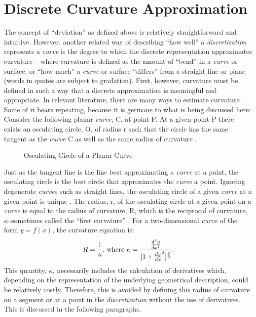 \section{Discrete Curvature Approximation}
The concept of ``deviation'' as defined above is relatively 
straightforward and intuitive. However, another related way of describing 
``how well'' a \textit{discretization} represents a \textit{curve} is the 
degree to which the discrete representation approximates curvature -- 
where curvature is defined as the amount of ``bend'' in a \textit{curve} 
or surface, or ``how much'' a \textit{curve} or surface ``differs'' from a 
straight line or plane (words in quotes are subject to gradation). First, 
however, curvature must be defined in such a way that a discrete 
approximation is meaningful and appropriate. In relevant literature, there 
are many ways to estimate curvature \cite{hermann07}. Some of it bears 
repeating, because it is germane to what is being discussed here: Consider 
the following planar \textit{curve}, C, at point P. At a given point P 
there exists an osculating circle, O, of radius r such that the circle has 
the same tangent as the \textit{curve} C as well as the same radius of 
curvature \cite{gray97}.  

\begin{figure}[h!]
  \caption{\label{fig:OsculatingCircle} Osculating Circle of a Planar Curve}
\end{figure}

\noindent Just as the tangent line is the line best approximating a \textit{curve} at a point, the osculating 
circle is the best circle that approximates the \textit{curve} a point. Ignoring degenerate \textit{curve}s such 
as straight lines, the osculating circle of a given \textit{curve} at a given point is unique \cite{gray97}. The 
radius, r, of the osculating circle at a given point on a \textit{curve} is equal to the radius of curvature, R, 
which is the reciprocal of curvature, $\kappa$--sometimes called the ``first curvature'' \cite{kreyszig91}. For a 
two-dimensional \textit{curve} of the form $y=f(x)$, the curvature equation is: \[
R=\frac{1}{\kappa} \textnormal{, where } 
\kappa=\frac{\frac{d^2y}{dx^2}}{[1+\frac{dy}{dx}^2 ]^\frac{3}{2}}. 
\]
\noindent This quantity, $\kappa$, necessarily includes the calculation of 
derivatives which, depending on the representation of the underlying geometrical description, could be relatively costly. Therefore, this is avoided by defining this radius of curvature on a segment or at a point in the \textit{discretization} without the use of derivatives. This is discussed in the following paragraphs.

